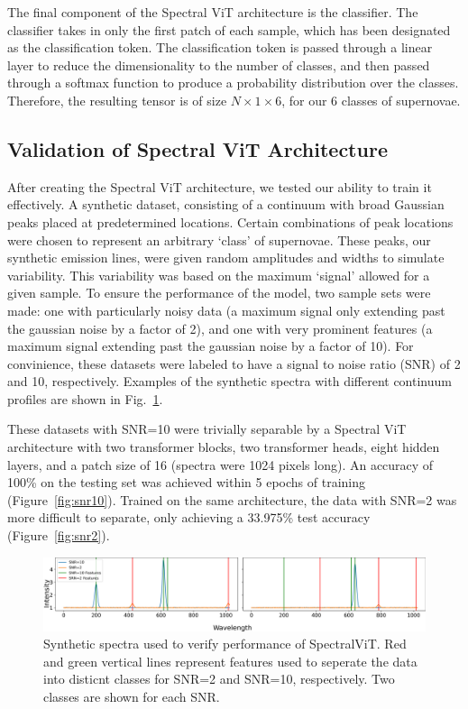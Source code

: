The final component of the Spectral ViT architecture is the classifier. The classifier
takes in only the first patch of each sample, which has been designated as the classification token.
The classification token is passed through a linear layer to reduce the dimensionality to the
number of classes, and then passed through a softmax function to produce a probability distribution
over the classes. Therefore, the resulting tensor is of size $N \times 1 \times 6$, for our 
6 classes of supernovae.

\subsection{Validation of Spectral ViT Architecture}
\label{ssec:validation}
After creating the Spectral ViT architecture, we tested our  ability to train it 
effectively. A synthetic dataset, consisting of a continuum with 
broad Gaussian peaks placed at predetermined locations. Certain combinations of 
peak locations were chosen to represent an arbitrary `class' of supernovae. These peaks, 
our synthetic emission lines, were given random amplitudes and widths to simulate 
variability. This variability was based on the maximum `signal' allowed for a given sample. 
To ensure the performance of the model, two sample sets were made: one with particularly noisy data 
(a maximum signal only extending past the gaussian noise by a factor of 2), and one with 
very prominent features (a maximum signal extending past the gaussian noise by a factor of 10). For 
convinience, these datasets were labeled to have a signal to noise ratio (SNR) of 2 and 10, respectively. 
Examples of the synthetic spectra with different continuum profiles are shown in Fig.~\ref{fig:synth_spectra}. 

These datasets with SNR=10 were trivially separable by a Spectral ViT architecture 
with two transformer blocks, two transformer heads, eight hidden layers, and a patch size of 16 (spectra were 1024 pixels long). 
An accuracy of 100\% on the testing set was achieved within 5 epochs of training (Figure~\ref{fig:snr10}). Trained on the same 
architecture, the data with SNR=2 was more difficult to separate, only achieving a 33.975\% test accuracy (Figure~\ref{fig:snr2}).


\begin{figure}
    \centering
    \includegraphics[width=\textwidth]{figures/synth_data_new.png}
    \caption[Synthetic spectra]{Synthetic spectra used to verify performance of SpectralViT. Red and green vertical lines represent features used to 
    seperate the data into disticnt classes for SNR=2 and SNR=10, respectively. Two classes are shown for each SNR.}
    \label{fig:synth_spectra}
\end{figure}

